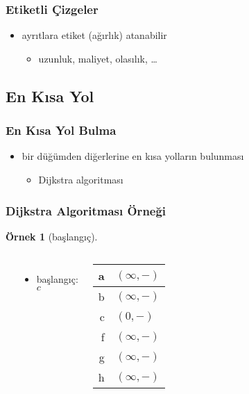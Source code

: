 \documentclass[dvipsnames]{beamer}
\theoremstyle{definition}
\theoremstyle{example}
\newtheorem{ornek}[theorem]{Örnek}
\theoremstyle{plain}
\begin{document}
\begin{frame}
  \frametitle{Etiketli Çizgeler}

  \begin{itemize}
    \item ayrıtlara etiket (ağırlık) atanabilir
    \begin{itemize}
      \item uzunluk, maliyet, olasılık, \dots
    \end{itemize}
  \end{itemize}
\end{frame}

\subsection{En Kısa Yol}

\begin{frame}
  \frametitle{En Kısa Yol Bulma}

  \begin{itemize}
    \item bir düğümden diğerlerine en kısa yolların bulunması
    \begin{itemize}
      \item Dijkstra algoritması
    \end{itemize}
  \end{itemize}
\end{frame}

\begin{frame}
  \frametitle{Dijkstra Algoritması Örneği}

  \begin{ornek}[başlangıç]
    \begin{columns}
      \begin{center}
      \end{center}

      \begin{itemize}
        \item başlangıç: $c$
      \end{itemize}

      \begin{table}
        \begin{tabular}{r|l}
          a & $(\infty,-)$ \\\hline
          b & $(\infty,-)$ \\\hline
          c & $(0,-)$      \\\hline
          f & $(\infty,-)$ \\\hline
          g & $(\infty,-)$ \\\hline
          h & $(\infty,-)$
        \end{tabular}
      \end{table}
    \end{columns}
  \end{ornek}
\end{frame}
\end{document}
